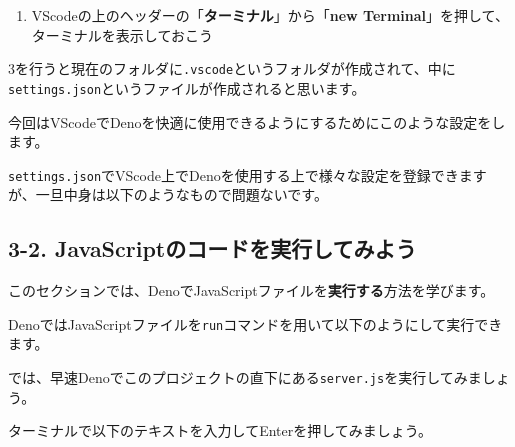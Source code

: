 \begin{enumerate}
\def\labelenumi{\arabic{enumi}.}
\setcounter{enumi}{3}
\tightlist
\item
  VScodeの上のヘッダーの「\textbf{ターミナル}」から「\textbf{new
  Terminal}」を押して、ターミナルを表示しておこう
\end{enumerate}

3を行うと現在のフォルダに\texttt{.vscode}というフォルダが作成されて、中に\texttt{settings.json}というファイルが作成されると思います。

今回はVScodeでDenoを快適に使用できるようにするためにこのような設定をします。

\texttt{settings.json}でVScode上でDenoを使用する上で様々な設定を登録できますが、一旦中身は以下のようなもので問題ないです。

\begin{Shaded}
\begin{Highlighting}[]
\FunctionTok{\{}
  \FunctionTok{:} \FunctionTok{,}
  \FunctionTok{:} 
\FunctionTok{\}}
\end{Highlighting}
\end{Shaded}

\subsection{3-2.
JavaScriptのコードを実行してみよう}\label{javascriptux306eux30b3ux30fcux30c9ux3092ux5b9fux884cux3057ux3066ux307fux3088ux3046}

このセクションでは、DenoでJavaScriptファイルを\textbf{実行する}方法を学びます。

DenoではJavaScriptファイルを\texttt{run}コマンドを用いて以下のようにして実行できます。

\begin{Shaded}
\begin{Highlighting}[]
\end{Highlighting}
\end{Shaded}

では、早速Denoでこのプロジェクトの直下にある\texttt{server.js}を実行してみましょう。

ターミナルで以下のテキストを入力してEnterを押してみましょう。

\begin{Shaded}
\begin{Highlighting}[]
\end{Highlighting}
\end{Shaded}

